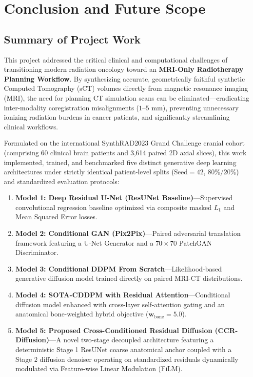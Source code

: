 \chapter{Conclusion and Future Scope}

\section{Summary of Project Work}
This project addressed the critical clinical and computational challenges of transitioning modern radiation oncology toward an \textbf{MRI-Only Radiotherapy Planning Workflow}. By synthesizing accurate, geometrically faithful synthetic Computed Tomography (sCT) volumes directly from magnetic resonance imaging (MRI), the need for planning CT simulation scans can be eliminated—eradicating inter-modality coregistration misalignments ($1\text{--}5\text{ mm}$), preventing unnecessary ionizing radiation burdens in cancer patients, and significantly streamlining clinical workflows.

Formulated on the international SynthRAD2023 Grand Challenge cranial cohort (comprising 60 clinical brain patients and 3,614 paired 2D axial slices), this work implemented, trained, and benchmarked five distinct generative deep learning architectures under strictly identical patient-level splits ($\text{Seed} = 42$, $80\% / 20\%$) and standardized evaluation protocols:
\begin{enumerate}
    \item \textbf{Model 1: Deep Residual U-Net (ResUNet Baseline)}—Supervised convolutional regression baseline optimized via composite masked $L_1$ and Mean Squared Error losses.
    \item \textbf{Model 2: Conditional GAN (Pix2Pix)}—Paired adversarial translation framework featuring a U-Net Generator and a $70 \times 70$ PatchGAN Discriminator.
    \item \textbf{Model 3: Conditional DDPM From Scratch}—Likelihood-based generative diffusion model trained directly on paired MRI-CT distributions.
    \item \textbf{Model 4: SOTA-CDDPM with Residual Attention}—Conditional diffusion model enhanced with cross-layer self-attention gating and an anatomical bone-weighted hybrid objective ($\mathbf{w}_{\text{bone}} = 5.0$).
    \item \textbf{Model 5: Proposed Cross-Conditioned Residual Diffusion (CCR-Diffusion)}—A novel two-stage decoupled architecture featuring a deterministic Stage 1 ResUNet coarse anatomical anchor coupled with a Stage 2 diffusion denoiser operating on standardized residuals dynamically modulated via Feature-wise Linear Modulation (FiLM).
\end{enumerate}

